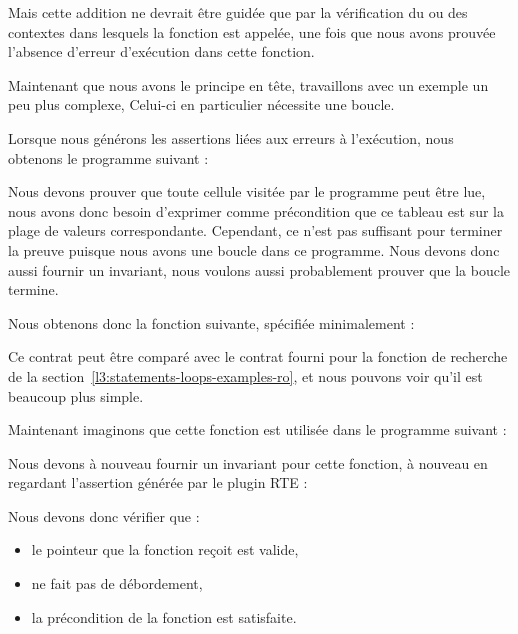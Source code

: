 

Mais cette addition ne devrait être guidée que par la vérification du ou des
contextes dans lesquels la fonction est appelée, une fois que nous avons
prouvée l'absence d'erreur d'exécution dans cette fonction.




Maintenant que nous avons le principe en tête, travaillons avec un exemple un peu
plus complexe, Celui-ci en particulier nécessite une boucle.




Lorsque nous générons les assertions liées aux erreurs à l'exécution, nous
obtenons le programme suivant :




Nous devons prouver que toute cellule visitée par le programme peut être lue,
nous avons donc besoin d'exprimer comme précondition que ce tableau est
 sur la plage de valeurs correspondante.
Cependant, ce n'est pas suffisant pour terminer la preuve puisque nous avons une
boucle dans ce programme. Nous devons donc aussi fournir un invariant, nous
voulons aussi probablement prouver que la boucle termine.


Nous obtenons donc la fonction suivante, spécifiée minimalement :





Ce contrat peut être comparé avec le contrat fourni pour la fonction de recherche
de la section~\ref{l3:statements-loops-examples-ro}, et nous pouvons voir qu'il est
beaucoup plus simple.


Maintenant imaginons que cette fonction est utilisée dans le programme suivant :




Nous devons à nouveau fournir un invariant pour cette fonction, à nouveau en
regardant l'assertion générée par le plugin RTE :




Nous devons donc vérifier que :
\begin{itemize}
\item le pointeur que la fonction reçoit est valide,
\item {} ne fait pas de débordement,
\item la précondition de la fonction  est satisfaite.
\end{itemize}


